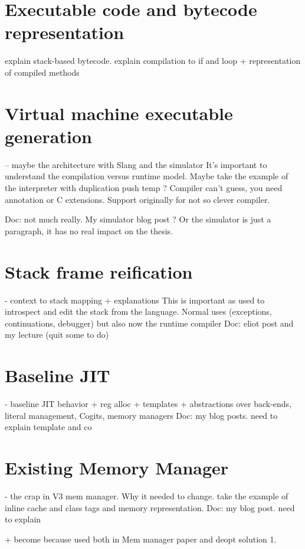 \documentclass[a4paper,12pt,twoside]{../includes/ThesisStyle}
\begin{document}
\section{Executable code and bytecode representation}

explain stack-based bytecode.
explain compilation to if and loop
+ representation of compiled methods 

\section{Virtual machine executable generation}
-- maybe the architecture with Slang and the simulator
It's important to understand the compilation versus runtime model.
Maybe take the example of the interpreter with duplication push temp ? Compiler can't guess, you need annotation or C extensions. Support originally for not so clever compiler.

Doc: not much really. My simulator blog post ?
Or the simulator is just a paragraph, it has no real impact on the thesis.

\section{Stack frame reification}
- context to stack mapping + explanations
This is important as used to introspect and edit the stack from the language. Normal uses (exceptions, continuations, debugger) but also now the runtime compiler
Doc: eliot post and my lecture (quit some to do)

\section{Baseline JIT}
- baseline JIT behavior + reg alloc + templates + abstractions over back-ends, literal management, Cogits, memory managers
Doc: my blog posts. need to explain template and co

\section{Existing Memory Manager}
- the crap in V3 mem manager. Why it needed to change.
take the example of inline cache and class tags and memory representation.
Doc: my blog post. need to explain


+ become because used both in Mem manager paper and deopt solution 1.

\ifx\wholebook\relax\else
    
\end{document}
